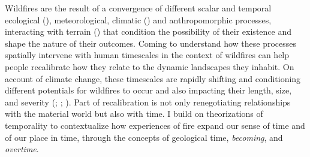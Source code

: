 \documentclass[
]{article}
\begin{document}
Wildfires are the result of a convergence of different scalar and temporal ecological (), meteorological, climatic () and anthropomorphic processes, interacting with terrain () that condition the possibility of their existence and shape the nature of their outcomes. Coming to understand how these processes spatially intervene with human timescales in the context of wildfires can help people recalibrate how they relate to the dynamic landscapes they inhabit. On account of climate change, these timescales are rapidly shifting and conditioning different potentials for wildfires to occur and also impacting their length, size, and severity (; ; ). Part of recalibration is not only renegotiating relationships with the material world but also with time. I build on theorizations of temporality to contextualize how experiences of fire expand our sense of time and of our place in time, through the concepts of geological time, \emph{becoming}, and \emph{overtime}.
\end{document}
